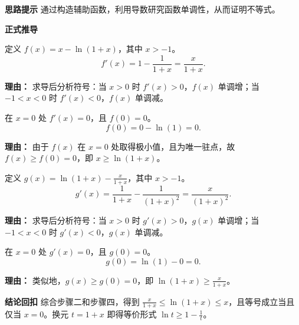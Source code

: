 \begin{proofbox}
\textbf{\textcolor{CProof}{思路提示}}
通过构造辅助函数，利用导数研究函数单调性，从而证明不等式。

\medskip
\textbf{\textcolor{CProof}{正式推导}}
\begin{description}[style=nextline, leftmargin=2.8em, labelsep=0.5em, itemsep=0.55em]
    \item[\textbf{步骤一（构造函数上界）：}] 定义 $f(x) = x - \ln(1+x)$，其中 $x > -1$。
    \[
    f'(x) = 1 - \frac{1}{1+x} = \frac{x}{1+x}.
    \]
    \par\textbf{理由：}
    求导后分析符号：当 $x > 0$ 时 $f'(x) > 0$，$f(x)$ 单调增；当 $-1 < x < 0$ 时 $f'(x) < 0$，$f(x)$ 单调减。

    \item[\textbf{步骤二（判断极值点）：}] 在 $x=0$ 处 $f'(x)=0$，且 $f(0)=0$。
    \[
    f(0) = 0 - \ln(1) = 0.
    \]
    \par\textbf{理由：}
    由于 $f(x)$ 在 $x=0$ 处取得极小值，且为唯一驻点，故 $f(x) \ge f(0) = 0$，即 $x \ge \ln(1+x)$。

    \item[\textbf{步骤三（构造函数下界）：}] 定义 $g(x) = \ln(1+x) - \frac{x}{1+x}$，其中 $x > -1$。
    \[
    g'(x) = \frac{1}{1+x} - \frac{1}{(1+x)^2} = \frac{x}{(1+x)^2}.
    \]
    \par\textbf{理由：}
    求导后分析符号：当 $x > 0$ 时 $g'(x) > 0$，$g(x)$ 单调增；当 $-1 < x < 0$ 时 $g'(x) < 0$，$g(x)$ 单调减。

    \item[\textbf{步骤四（判断极值点）：}] 在 $x=0$ 处 $g'(x)=0$，且 $g(0)=0$。
    \[
    g(0) = \ln(1) - 0 = 0.
    \]
    \par\textbf{理由：}
    类似地，$g(x) \ge g(0) = 0$，即 $\ln(1+x) \ge \frac{x}{1+x}$。
\end{description}

\medskip
\textbf{\textcolor{CProof}{结论回扣}}
综合步骤二和步骤四，得到 $\frac{x}{1+x} \le \ln(1+x) \le x$，且等号成立当且仅当 $x=0$。换元 $t=1+x$ 即得等价形式 $\ln t \ge 1 - \frac{1}{t}$。
\end{proofbox}
